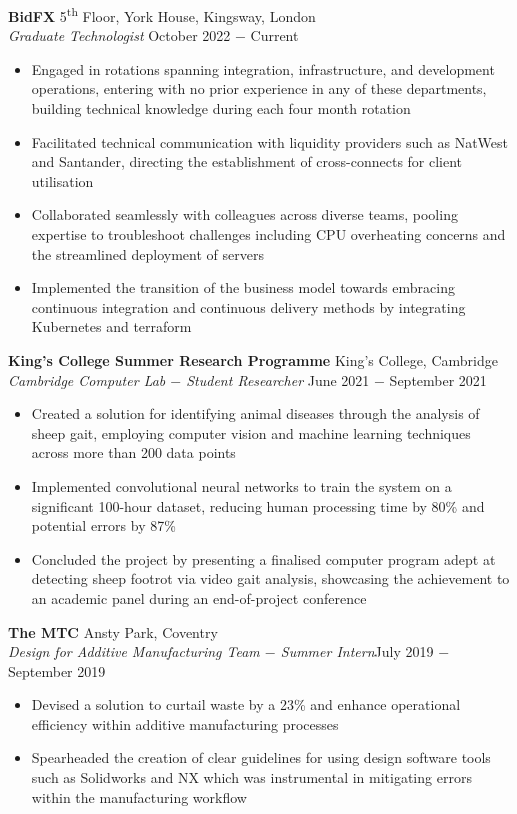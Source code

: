 \documentclass{article}
\begin{document}
\textbf{BidFX} \hfill 5\textsuperscript{th} Floor, York House, Kingsway, London\\
\textit{Graduate Technologist} \hfill October 2022 $-$ Current
\begin{itemize}
    \item Engaged in rotations spanning integration, infrastructure, and development operations, entering with no prior experience in any of these departments, building technical knowledge during each four month rotation
    \item Facilitated technical communication with liquidity providers such as NatWest and Santander, directing the establishment of cross-connects for client utilisation
    \item Collaborated seamlessly with colleagues across diverse teams, pooling expertise to troubleshoot challenges including CPU overheating concerns and the streamlined deployment of servers 
    \item Implemented the transition of the business model towards embracing continuous integration and continuous delivery methods by integrating Kubernetes and terraform
\end{itemize} \medskip

\textbf{King's College Summer Research Programme} \hfill King's College, Cambridge \\
\textit{Cambridge Computer Lab $-$ Student Researcher} \hfill June 2021 $-$ September 2021
\begin{itemize}
    \item Created a solution for identifying animal diseases through the analysis of sheep gait, employing computer vision and machine learning techniques across more than 200 data points
    \item Implemented convolutional neural networks to train the system on a significant 100-hour dataset, reducing human processing time by 80\% and potential errors by 87\%
    \item Concluded the project by presenting a finalised computer program adept at detecting sheep footrot via video gait analysis, showcasing the achievement to an academic panel during an end-of-project conference%
\end{itemize} \medskip

\textbf{The MTC} \hfill Ansty Park, Coventry \\
\textit{Design for Additive Manufacturing Team $-$ Summer Intern}\hfill July 2019 $-$ September 2019
\begin{itemize}
    \item Devised a solution to curtail waste by a 23\% and enhance operational efficiency within additive manufacturing processes
    \item Spearheaded the creation of clear guidelines for using design software tools such as Solidworks and NX which was instrumental in mitigating errors within the manufacturing workflow
\end{itemize} \medskip
\end{document}
